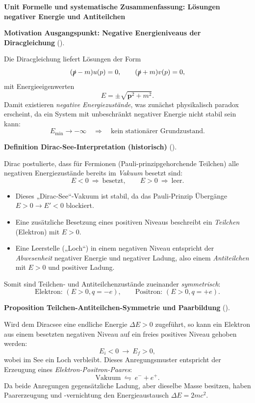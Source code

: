 \documentclass[10pt, letterpaper]{article}
\newcommand{\CustomHeading}[3]{%
  \par\medskip\noindent%
  \textbf{#1 #2} \textnormal{(#3)}.\enskip%
}
\newenvironment{DEF}[2]{\begin{unitbox}\CustomHeading{Definition}{#1}{#2}}{\end{unitbox}}
\newenvironment{PROP}[2]{\begin{unitbox}\CustomHeading{Proposition}{#1}{#2}}{\end{unitbox}}
\newenvironment{MOT}[2]{\begin{unitbox}\CustomHeading{Motivation}{#1}{#2}}{\end{unitbox}}
\newenvironment{unit}[1]
  {\begin{unitbox}\textbf{Unit #1}\par\smallskip}
  {\end{unitbox}}
\begin{document}
\begin{unit}{Formelle und systematische Zusammenfassung: Lösungen negativer Energie und Antiteilchen}

\begin{MOT}{Ausgangspunkt: Negative Energieniveaus der Diracgleichung}{}
Die Diracgleichung liefert Lösungen der Form
\[
(\slashed{p}-m)u(p)=0,\qquad (\slashed{p}+m)v(p)=0,
\]
mit Energieeigenwerten
\[
E=\pm\sqrt{\mathbf p^2+m^2}.
\]
Damit existieren \emph{negative Energiezustände}, was zunächst physikalisch paradox erscheint, da ein System mit unbeschränkt negativer Energie nicht stabil sein kann:
\[
E_{\mathrm{min}}\to -\infty \quad\Rightarrow\quad \text{kein stationärer Grundzustand.}
\]
\end{MOT}

\begin{DEF}{Dirac-See-Interpretation (historisch)}{}
Dirac postulierte, dass für Fermionen (Pauli-prinzipgehorchende Teilchen)
alle negativen Energiezustände bereits im \emph{Vakuum} besetzt sind:
\[
E<0\ \Rightarrow\ \text{besetzt},\qquad E>0\ \Rightarrow\ \text{leer}.
\]
\begin{itemize}
\item Dieses „Dirac-See“-Vakuum ist stabil, da das Pauli-Prinzip Übergänge $E>0\to E'<0$ blockiert.
\item Eine zusätzliche Besetzung eines positiven Niveaus beschreibt ein \emph{Teilchen} (Elektron) mit $E>0$.
\item Eine Leerstelle („Loch“) in einem negativen Niveau entspricht der \emph{Abwesenheit} negativer Energie und negativer Ladung, also einem \emph{Antiteilchen} mit $E>0$ und positiver Ladung.
\end{itemize}
Somit sind Teilchen- und Antiteilchenzustände zueinander \emph{symmetrisch}:
\[
\text{Elektron: } (E>0,q=-e),
\qquad
\text{Positron: } (E>0,q=+e).
\]
\end{DEF}

\begin{PROP}{Teilchen-Antiteilchen-Symmetrie und Paarbildung}{}
Wird dem Diracsee eine endliche Energie $\Delta E>0$ zugeführt, so kann ein Elektron aus einem besetzten negativen Niveau auf ein freies positives Niveau gehoben werden:
\[
E_{i}<0\ \longrightarrow\ E_{f}>0,
\]
wobei im See ein Loch verbleibt. Dieses Anregungsmuster entspricht der Erzeugung eines \emph{Elektron-Positron-Paares}:
\[
\text{Vakuum}\ \leftrightharpoons\ e^{-}+e^{+}.
\]
Da beide Anregungen gegensätzliche Ladung, aber dieselbe Masse besitzen, haben Paarerzeugung und -vernichtung den Energieaustausch $\Delta E=2m c^2$.
\end{PROP}


\end{unit}
\end{document}
